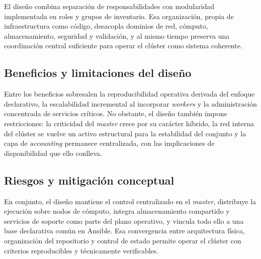 El diseño combina separación de responsabilidades con modularidad implementada en roles y grupos de inventario. Esa organización, propia de infraestructura como código, desacopla dominios de red, cómputo, almacenamiento, seguridad y validación, y al mismo tiempo preserva una coordinación central suficiente para operar el clúster como sistema coherente.

\subsection{Beneficios y limitaciones del diseño}
\label{subsec:arq_beneficios_limitaciones}

Entre los beneficios sobresalen la reproducibilidad operativa derivada del enfoque declarativo, la escalabilidad incremental al incorporar \textit{workers} y la administración concentrada de servicios críticos. No obstante, el diseño también impone restricciones: la criticidad del \textit{master} crece por su carácter híbrido, la red interna del clúster se vuelve un activo estructural para la estabilidad del conjunto y la capa de \textit{accounting} permanece centralizada, con las implicaciones de disponibilidad que ello conlleva.

\subsection{Riesgos y mitigación conceptual}
\label{subsec:arq_riesgos_mitigacion}

En conjunto, el diseño mantiene el control centralizado en el \textit{master}, distribuye la ejecución sobre nodos de cómputo, integra almacenamiento compartido y servicios de soporte como parte del plano operativo, y vincula todo ello a una base declarativa común en Ansible. Esa convergencia entre arquitectura física, organización del repositorio y control de estado permite operar el clúster con criterios reproducibles y técnicamente verificables.
